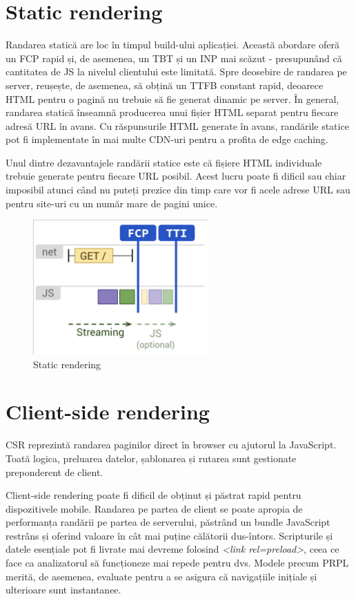 \documentclass[12pt, a4paper]{report}
\begin{document}
\section{Static rendering}
Randarea statică are loc în timpul build-ului aplicației. Această abordare oferă un FCP rapid și, de asemenea, un TBT și un INP mai scăzut - presupunând că cantitatea de JS la nivelul clientului este limitată. Spre deosebire de randarea pe server, reușește, de asemenea, să obțină un TTFB constant rapid, deoarece HTML pentru o pagină nu trebuie să fie generat dinamic pe server. În general, randarea statică înseamnă producerea unui fișier HTML separat pentru fiecare adresă URL în avans. Cu răspunsurile HTML generate în avans, randările statice pot fi implementate în mai multe CDN-uri pentru a profita de edge caching.

Unul dintre dezavantajele randării statice este că fișiere HTML individuale trebuie generate pentru fiecare URL posibil. Acest lucru poate fi dificil sau chiar imposibil atunci când nu puteți prezice din timp care vor fi acele adrese URL sau pentru site-uri cu un număr mare de pagini unice.

\begin{figure}[htbp]
	\centering
	\includegraphics[width=0.6\textwidth]{static-rendering.png}
	\caption{Static rendering}
	\label{fig:sr}
\end{figure}

\section{Client-side rendering}
CSR reprezintă randarea paginilor direct în browser cu ajutorul la JavaScript. Toată logica, preluarea datelor, șablonarea și rutarea sunt gestionate preponderent de client.

Client-side rendering poate fi dificil de obținut și păstrat rapid pentru dispozitivele mobile. Randarea pe partea de client se poate apropia de performanța randării pe partea de serverului, păstrând un bundle JavaScript restrâns și oferind valoare în cât mai puține călătorii dus-întors. Scripturile și datele esențiale pot fi livrate mai devreme folosind \emph{<link rel=preload>}, ceea ce face ca analizatorul să funcționeze mai repede pentru dvs. Modele precum PRPL merită, de asemenea, evaluate pentru a se asigura că navigațiile inițiale și ulterioare sunt instantanee.
\end{document}
